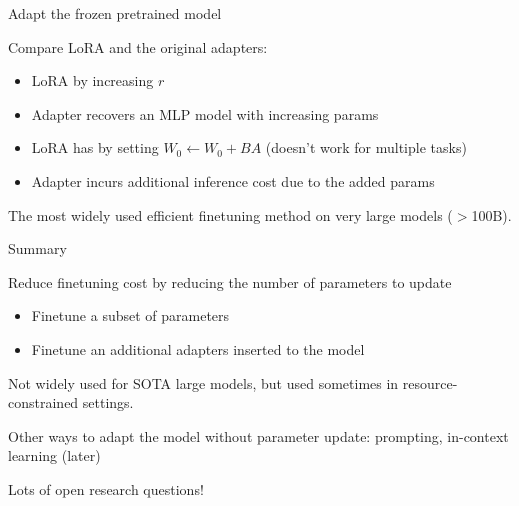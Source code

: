 \documentclass[usenames,dvipsnames,notes,11pt,aspectratio=169,hyperref={colorlinks=true, linkcolor=blue}]{beamer}
\begin{document}
\begin{frame}
    {Adapt the frozen pretrained model}

    Compare LoRA and the original adapters:
    \begin{itemize}
        \item LoRA  by increasing $r$
        \item[] Adapter recovers an MLP model with increasing params
            \pause
        \item LoRA has 
            \pause by setting $W_0 \leftarrow W_0 + BA$ (doesn't work for multiple tasks)
        \item[] Adapter incurs additional inference cost due to the added params
    \end{itemize}

    The most widely used efficient finetuning method on very large models ($>$100B).
\end{frame}

\begin{frame}
    {Summary}

    Reduce finetuning cost by reducing the number of parameters to update\\
    \begin{itemize}
        \item Finetune a subset of parameters
        \item Finetune an additional adapters inserted to the model
    \end{itemize}

    Not widely used for SOTA large models, but used sometimes in resource-constrained settings.

    Other ways to adapt the model without parameter update: prompting, in-context learning (later)

    Lots of open research questions!

\end{frame}
\end{document}
